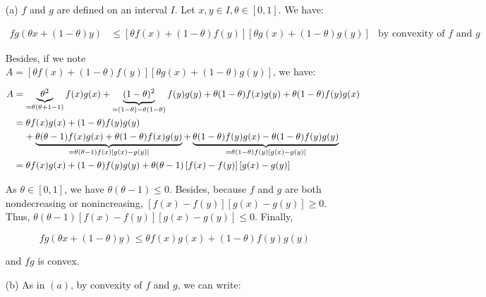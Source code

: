 \documentclass[a4paper, 11pt]{report}
\begin{document}
\begin{itemize}
    \item[(a)] $f$ and $g$ are defined on an interval $I$. Let $x, y \in I, \theta \in [0, 1]$. We have:
    
    \begin{equation*}
        \begin{aligned}
            fg(\theta x + (1 - \theta)y) &\leq \left[ \theta f(x) + (1-\theta)f(y) \right] \left[ \theta g(x) + (1-\theta)g(y) \right] & \text{by convexity of $f$ and $g$}
        \end{aligned}
    \end{equation*}
    
    Besides, if we note $A = \left[ \theta f(x) + (1-\theta)f(y) \right] \left[ \theta g(x) + (1-\theta)g(y) \right]$, we have:
    
    \begin{equation*}
        \begin{aligned}
        A &= \underbrace{\theta^{2}}_{= \theta(\theta + 1 - 1)}f(x)g(x) + \underbrace{(1 - \theta)^{2}}_{= (1 - \theta) - \theta( 1 - \theta)}f(y)g(y) + \theta(1 - \theta)f(x)g(y) + \theta(1 - \theta)f(y)g(x) \\
         &= \theta f(x)g(x) + (1 - \theta)f(y)g(y) \\
         &\hspace{0.4cm} + \underbrace{\theta(\theta - 1)f(x)g(x) + \theta(1 - \theta)f(x)g(y)}_{= \theta(\theta - 1) f(x) \left[ g(x) - g(y) \right]} + \underbrace{\theta(1 - \theta)f(y)g(x) - \theta(1 - \theta)f(y)g(y)}_{= \theta(1 - \theta)f(y) \left[ g(x) - g(y) \right]} \\
         &= \theta f(x)g(x) + (1 - \theta)f(y)g(y) + \theta(\theta - 1) \left[ f(x) - f(y) \right] \left[ g(x) - g(y) \right]
        \end{aligned}
    \end{equation*}
    
    As $\theta \in [0, 1]$, we have $\theta(\theta - 1) \leq 0$. Besides, because $f$ and $g$ are both nondecreasing or nonincreasing, $\left[ f(x) - f(y) \right] \left[ g(x) - g(y) \right] \geq 0$. Thus, $\theta(\theta - 1) \left[ f(x) - f(y) \right] \left[ g(x) - g(y) \right] \leq 0$. Finally,
    
    \[ fg(\theta x + (1 - \theta)y) \leq \theta f(x)g(x) + (1 - \theta)f(y)g(y) \]
    
    and $fg$ is convex.
    
    \item[(b)] As in $(a)$, by convexity of $f$ and $g$, we can write:
    

\end{itemize}
\end{document}
